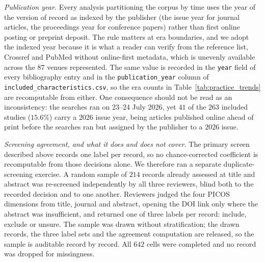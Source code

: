 \documentclass[review,authoryear]{elsarticle}
\begin{document}
\emph{Publication year.} Every analysis partitioning the corpus by time uses the year of
the version of record as indexed by the publisher (the issue year for journal articles,
the proceedings year for conference papers) rather than first online posting or preprint
deposit. The rule matters at era boundaries, and we adopt the indexed year because it is
what a reader can verify from the reference list, Crossref and PubMed without online-first
metadata, which is unevenly available across the $87$ venues represented. The same value is
recorded in the \texttt{year} field of every bibliography entry and in the
\texttt{publication\_year} column of \texttt{included\_characteristics.csv}, so the era
counts in Table~\ref{tab:practice_trends} are recomputable from either. One consequence
should not be read as an inconsistency: the searches ran on 23--24 July 2026, yet $41$ of
the $263$ included studies ($15.6\%$) carry a $2026$ issue year, being articles published
online ahead of print before the searches ran but assigned by the publisher to a $2026$
issue.

\emph{Screening agreement, and what it does and does not cover.} The primary screen
described above records one label per record, so no chance-corrected coefficient is
recomputable from those decisions alone. We therefore ran a separate duplicate-screening
exercise. A random sample of $214$ records already assessed at title and abstract was
re-screened independently by all three reviewers, blind both to the recorded decision
and to one another. Reviewers judged the four PICOS dimensions from title, journal and
abstract, opening the DOI link only where the abstract was insufficient, and returned one
of three labels per record: include, exclude or unsure. The sample was drawn without
stratification; the drawn records, the three label sets and the agreement computation are
released, so the sample is auditable record by record. All $642$ cells were completed and
no record was dropped for missingness.
\end{document}
